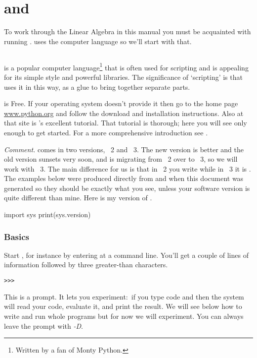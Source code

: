 \chapter{\python{} and \Sage{}}

To work through the Linear Algebra in this manual
you must be acquainted with running \Sage. 
\Sage{} uses the computer language \python{} so we'll start with that.


\section{\python}
\python{} is a popular computer language\footnote{Written by a fan of
Monty Python.} 
that is often used for scripting and
is appealing for its simple style and powerful libraries.
The significance of `scripting' is that \Sage{} uses it in this way,
as a glue to bring together separate parts.

\python{} is Free.
If your operating system doesn't provide it then go to the home 
page \href{http://www.python.org}{\url{www.python.org}} and follow the
download and installation instructions.
Also at that site is \python's excellent tutorial.
That tutorial is thorough; 
here you will see only enough \python{} to get started.
For a more comprehensive introduction see \cite{PythonTeam12b}.

\smallskip
\textit{Comment.}
\python{} comes in two versions, \python~2 and \python~3.
The new version is better and the old version sunsets very soon, and
\Sage{} is migrating from \python~2 over to \python~3, so we will
work with \python~3. 
The main difference for us is that in \python~2 you write
 while in \python~3 it is . 
The examples below were produced directly 
from \python{} and \Sage{} when this document was generated so they should be 
exactly what you see, 
unless your software version is quite different than mine.
Here is my version of \python. 
\begin{pyconsole}
import sys
print(sys.version)
\end{pyconsole}

\subsection{Basics}
Start \python, for instance by entering 
at a command line.
You'll get a couple of lines of 
information followed by three greater-than
characters.
\begin{lstlisting}[style=python]
>>>   
\end{lstlisting}
This is a prompt.
It lets you experiment:~if you type 
\python{} code and  then the system
will read your code, evaluate it, and print the result.
We will see below how to write and run whole programs
but for now we will experiment.
You can always leave the prompt with \textit{-D}.

